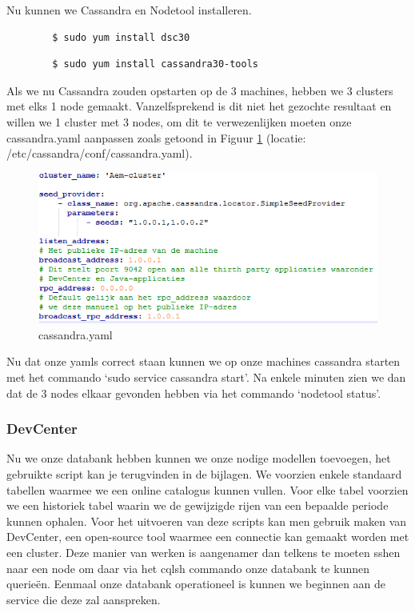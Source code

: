 \documentclass{article}
\begin{document}
	\par
	Nu kunnen we Cassandra en Nodetool installeren.
	\begin{lstlisting}
		$ sudo yum install dsc30
	\end{lstlisting}
	\begin{lstlisting}
		$ sudo yum install cassandra30-tools
	\end{lstlisting}
	
	\par
	Als we nu Cassandra zouden opstarten op de 3 machines, hebben we 3 clusters met elks 1 node gemaakt. 
	Vanzelfsprekend is dit niet het gezochte resultaat en willen we 1 cluster met 3 nodes, om dit te verwezenlijken moeten onze cassandra.yaml aanpassen zoals getoond in Figuur \ref{fig:cassandra.yaml} (locatie: /etc/cassandra/conf/cassandra.yaml).
	\begin{figure}[h!]
  		\includegraphics[width=\linewidth]{images/cassandra-yaml.PNG}
  		\caption{cassandra.yaml}
  		\label{fig:cassandra.yaml}
	\end{figure}
	
	\par
	Nu dat onze yamls correct staan kunnen we op onze machines cassandra starten met het commando ‘sudo service cassandra start’. 
	Na enkele minuten zien we dan dat de 3 nodes elkaar gevonden hebben via het commando ‘nodetool status’.
	
	\par
	\subsubsection{DevCenter}
	 Nu we onze databank hebben kunnen we onze nodige modellen toevoegen, het gebruikte script kan je terugvinden in de bijlagen. We voorzien enkele standaard tabellen waarmee we een online catalogus kunnen vullen. Voor elke tabel voorzien we een historiek tabel waarin we de gewijzigde rijen van een bepaalde periode kunnen ophalen.
	 Voor het uitvoeren van deze scripts kan men gebruik maken van DevCenter, een open-source tool waarmee een connectie kan gemaakt worden met een cluster. 
	 Deze manier van werken is aangenamer dan telkens te moeten sshen naar een node om daar via het cqlsh commando onze databank te kunnen querieën.
	 Eenmaal onze databank operationeel is kunnen we beginnen aan de service die deze zal aanspreken.
\end{document}
